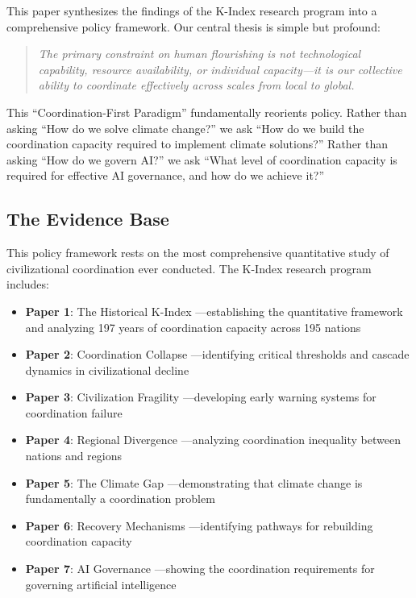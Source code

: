 \documentclass[12pt,letterpaper]{article}
\begin{document}
This paper synthesizes the findings of the K-Index research program into a comprehensive policy framework. Our central thesis is simple but profound:

\begin{quote}
\textit{The primary constraint on human flourishing is not technological capability, resource availability, or individual capacity---it is our collective ability to coordinate effectively across scales from local to global.}
\end{quote}

This ``Coordination-First Paradigm'' fundamentally reorients policy. Rather than asking ``How do we solve climate change?'' we ask ``How do we build the coordination capacity required to implement climate solutions?'' Rather than asking ``How do we govern AI?'' we ask ``What level of coordination capacity is required for effective AI governance, and how do we achieve it?''

\subsection{The Evidence Base}

This policy framework rests on the most comprehensive quantitative study of civilizational coordination ever conducted. The K-Index research program includes:

\begin{itemize}
    \item \textbf{Paper 1}: The Historical K-Index \citep{Paper1}---establishing the quantitative framework and analyzing 197 years of coordination capacity across 195 nations
    \item \textbf{Paper 2}: Coordination Collapse \citep{Paper2}---identifying critical thresholds and cascade dynamics in civilizational decline
    \item \textbf{Paper 3}: Civilization Fragility \citep{Paper3}---developing early warning systems for coordination failure
    \item \textbf{Paper 4}: Regional Divergence \citep{Paper4}---analyzing coordination inequality between nations and regions
    \item \textbf{Paper 5}: The Climate Gap \citep{Paper5}---demonstrating that climate change is fundamentally a coordination problem
    \item \textbf{Paper 6}: Recovery Mechanisms \citep{Paper6}---identifying pathways for rebuilding coordination capacity
    \item \textbf{Paper 7}: AI Governance \citep{Paper7}---showing the coordination requirements for governing artificial intelligence
\end{itemize}
\end{document}
